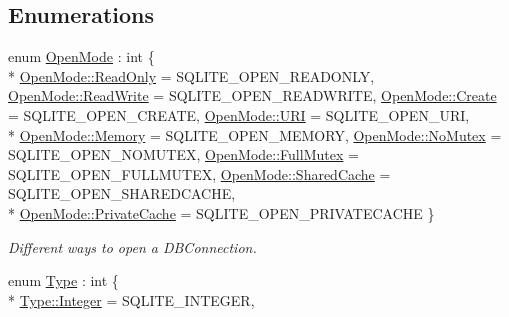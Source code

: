 \subsection*{Enumerations}
\begin{DoxyCompactItemize}
\item 
enum \hyperlink{a00038_a0d8721ab00cfcf85ba4eed715ccfecec}{Open\-Mode} \-: int \{ \\*
\hyperlink{a00038_a0d8721ab00cfcf85ba4eed715ccfececa131fb182a881796e7606ed6da27f1197}{Open\-Mode\-::\-Read\-Only} = S\-Q\-L\-I\-T\-E\-\_\-\-O\-P\-E\-N\-\_\-\-R\-E\-A\-D\-O\-N\-L\-Y, 
\hyperlink{a00038_a0d8721ab00cfcf85ba4eed715ccfececa70a2a84088d405a2e3f1e3accaa16723}{Open\-Mode\-::\-Read\-Write} = S\-Q\-L\-I\-T\-E\-\_\-\-O\-P\-E\-N\-\_\-\-R\-E\-A\-D\-W\-R\-I\-T\-E, 
\hyperlink{a00038_a0d8721ab00cfcf85ba4eed715ccfececa686e697538050e4664636337cc3b834f}{Open\-Mode\-::\-Create} = S\-Q\-L\-I\-T\-E\-\_\-\-O\-P\-E\-N\-\_\-\-C\-R\-E\-A\-T\-E, 
\hyperlink{a00038_a0d8721ab00cfcf85ba4eed715ccfececa8447306210a0972ac94b7d774799df1a}{Open\-Mode\-::\-U\-R\-I} = S\-Q\-L\-I\-T\-E\-\_\-\-O\-P\-E\-N\-\_\-\-U\-R\-I, 
\\*
\hyperlink{a00038_a0d8721ab00cfcf85ba4eed715ccfececa4789f23283b3a61f858b641a1bef19a3}{Open\-Mode\-::\-Memory} = S\-Q\-L\-I\-T\-E\-\_\-\-O\-P\-E\-N\-\_\-\-M\-E\-M\-O\-R\-Y, 
\hyperlink{a00038_a0d8721ab00cfcf85ba4eed715ccfececaed897a216de36c7c934c4baa02b4fea7}{Open\-Mode\-::\-No\-Mutex} = S\-Q\-L\-I\-T\-E\-\_\-\-O\-P\-E\-N\-\_\-\-N\-O\-M\-U\-T\-E\-X, 
\hyperlink{a00038_a0d8721ab00cfcf85ba4eed715ccfececa3322fce9aa781563c086ffd3c13da8b4}{Open\-Mode\-::\-Full\-Mutex} = S\-Q\-L\-I\-T\-E\-\_\-\-O\-P\-E\-N\-\_\-\-F\-U\-L\-L\-M\-U\-T\-E\-X, 
\hyperlink{a00038_a0d8721ab00cfcf85ba4eed715ccfececadd8141c2dbba4f369c304f748a6badf6}{Open\-Mode\-::\-Shared\-Cache} = S\-Q\-L\-I\-T\-E\-\_\-\-O\-P\-E\-N\-\_\-\-S\-H\-A\-R\-E\-D\-C\-A\-C\-H\-E, 
\\*
\hyperlink{a00038_a0d8721ab00cfcf85ba4eed715ccfececa54f0a906e1d7cbe43867c40793c22c91}{Open\-Mode\-::\-Private\-Cache} = S\-Q\-L\-I\-T\-E\-\_\-\-O\-P\-E\-N\-\_\-\-P\-R\-I\-V\-A\-T\-E\-C\-A\-C\-H\-E
 \}
\begin{DoxyCompactList}\small\item\em Different ways to open a D\-B\-Connection. \end{DoxyCompactList}\item 
enum \hyperlink{a00038_ad7a8ff5f375eca25eb6e3a51d746a04c}{Type} \-: int \{ \\*
\hyperlink{a00038_ad7a8ff5f375eca25eb6e3a51d746a04caa0faef0851b4294c06f2b94bb1cb2044}{Type\-::\-Integer} = S\-Q\-L\-I\-T\-E\-\_\-\-I\-N\-T\-E\-G\-E\-R, 

\end{DoxyCompactItemize}
